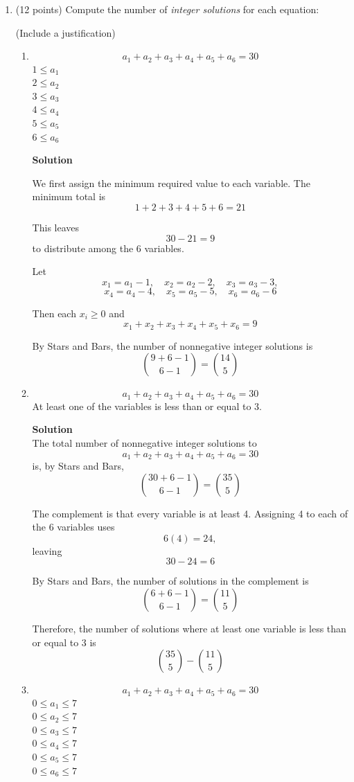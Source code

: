 \documentclass[10pt,letterpaper,unboxed,cm]{article}
\begin{document}
\begin{enumerate}
\item (12 points)
Compute the number of \emph{integer solutions} for each equation:

(Include a justification)

\begin{enumerate}
\item
$$a_1+a_2+a_3+a_4 + a_5 + a_6 = 30$$
$1\leq a_1$\\
$2\leq a_2$\\
$3\leq a_3$\\
$4\leq a_4$\\
$5\leq a_5$\\
$6\leq a_6$

\textbf{Solution}

We first assign the minimum required value to each variable. The minimum total is
\[1+2+3+4+5+6=21\]

This leaves
\[30-21=9\]
to distribute among the 6 variables.

Let
\[x_1=a_1-1,\quad x_2=a_2-2,\quad x_3=a_3-3,\]
\[x_4=a_4-4,\quad x_5=a_5-5,\quad x_6=a_6-6\]

Then each $x_i \geq 0$ and
\[x_1+x_2+x_3+x_4+x_5+x_6=9\]

By Stars and Bars, the number of nonnegative integer solutions is
\[\binom{9+6-1}{6-1}=\boxed{\binom{14}{5}}\]

\item
$$a_1+a_2+a_3+a_4 + a_5 + a_6= 30$$
At least one of the variables is less than or equal to 3.

\textbf{Solution}\\
The total number of nonnegative integer solutions to
\[a_1+a_2+a_3+a_4+a_5+a_6=30\]
is, by Stars and Bars,
\[\binom{30+6-1}{6-1}=\binom{35}{5}\]

The complement is that every variable is at least 4. Assigning 4 to
each of the 6 variables uses
\[6(4)=24,\]
leaving
\[30-24=6\]

By Stars and Bars, the number of solutions in the complement is
\[\binom{6+6-1}{6-1}=\binom{11}{5}\]

Therefore, the number of solutions where at least one variable is less
than or equal to 3 is
\[\boxed{\binom{35}{5}-\binom{11}{5}}\]

\item
$$a_1+a_2+a_3+a_4 + a_5 + a_6 = 30$$
$0\leq a_1\leq 7$\\
$0\leq a_2\leq 7$\\
$0\leq a_3\leq 7$\\
$0\leq a_4\leq 7$\\
$0\leq a_5\leq 7$\\
$0\leq a_6\leq 7$


\end{enumerate}
\end{enumerate}
\end{document}
